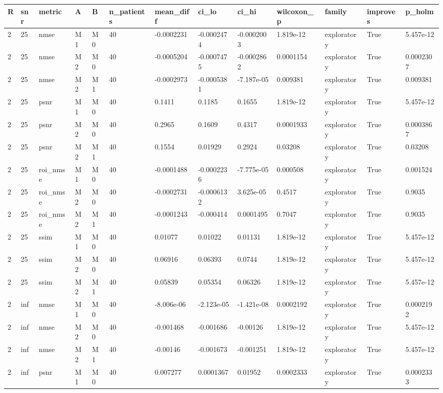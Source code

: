 \begin{tabular}{lllllllllllll}
\hline
R & snr & metric & A & B & n\_patients & mean\_diff & ci\_lo & ci\_hi & wilcoxon\_p & family & improves & p\_holm \\
\hline
2 & 25 & nmse & M1 & M0 & 40 & -0.0002231 & -0.0002474 & -0.0002003 & 1.819e-12 & exploratory & True & 5.457e-12 \\
2 & 25 & nmse & M2 & M0 & 40 & -0.0005204 & -0.0007475 & -0.0002862 & 0.0001154 & exploratory & True & 0.0002307 \\
2 & 25 & nmse & M2 & M1 & 40 & -0.0002973 & -0.0005381 & -7.187e-05 & 0.009381 & exploratory & True & 0.009381 \\
2 & 25 & psnr & M1 & M0 & 40 & 0.1411 & 0.1185 & 0.1655 & 1.819e-12 & exploratory & True & 5.457e-12 \\
2 & 25 & psnr & M2 & M0 & 40 & 0.2965 & 0.1609 & 0.4317 & 0.0001933 & exploratory & True & 0.0003867 \\
2 & 25 & psnr & M2 & M1 & 40 & 0.1554 & 0.01929 & 0.2924 & 0.03208 & exploratory & True & 0.03208 \\
2 & 25 & roi\_nmse & M1 & M0 & 40 & -0.0001488 & -0.0002236 & -7.775e-05 & 0.000508 & exploratory & True & 0.001524 \\
2 & 25 & roi\_nmse & M2 & M0 & 40 & -0.0002731 & -0.0006132 & 3.625e-05 & 0.4517 & exploratory & True & 0.9035 \\
2 & 25 & roi\_nmse & M2 & M1 & 40 & -0.0001243 & -0.000414 & 0.0001495 & 0.7047 & exploratory & True & 0.9035 \\
2 & 25 & ssim & M1 & M0 & 40 & 0.01077 & 0.01022 & 0.01131 & 1.819e-12 & exploratory & True & 5.457e-12 \\
2 & 25 & ssim & M2 & M0 & 40 & 0.06916 & 0.06393 & 0.0744 & 1.819e-12 & exploratory & True & 5.457e-12 \\
2 & 25 & ssim & M2 & M1 & 40 & 0.05839 & 0.05354 & 0.06326 & 1.819e-12 & exploratory & True & 5.457e-12 \\
2 & inf & nmse & M1 & M0 & 40 & -8.006e-06 & -2.123e-05 & -1.421e-08 & 0.0002192 & exploratory & True & 0.0002192 \\
2 & inf & nmse & M2 & M0 & 40 & -0.001468 & -0.001686 & -0.00126 & 1.819e-12 & exploratory & True & 5.457e-12 \\
2 & inf & nmse & M2 & M1 & 40 & -0.00146 & -0.001673 & -0.001251 & 1.819e-12 & exploratory & True & 5.457e-12 \\
2 & inf & psnr & M1 & M0 & 40 & 0.007277 & 0.0001367 & 0.01952 & 0.0002333 & exploratory & True & 0.0002333 \\

\end{tabular}
